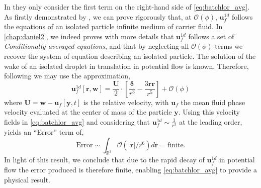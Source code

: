 In \citet{van1998pseudo} they only consider the first term on the right-hand side of \ref{eq:batchlor_avg}. 
As firstly demonstrated by \citet{hinch1977averaged}, we can prove rigorously that, at $\mathcal{O}(\phi)$, $\textbf{u}_f^{1d}$ follows the equations of an isolated particle infinite medium of carrier fluid. 
In \ref{chap:daniel2}, we indeed proves with more details that $\textbf{u}_f^{1d}$ follows a set of \textit{Conditionally averaged equations}, and that by neglecting all $\mathcal{O}(\phi)$ terms we recover the system of equation describing an isolated particle. 
The solution of the wake of an isolated droplet in translation in potential flow is known. 
Therefore, following \citet{van1998pseudo,zhang1994averaged} we may use the approximation, 
\begin{equation}
    \textbf{u}_f^{1d}[\textbf{r},\textbf{w}]
    = 
    \frac{\textbf{U}}{2}\cdot \left[
        \frac{\bm\delta}{r^3}-\frac{3\textbf{rr}}{r^5}
    \right]
    + \mathcal{O}(\phi)
    \label{eq:potential_sol}
\end{equation}
where $\textbf{U} = \textbf{w} - \textbf{u}_f[\textbf{y},t]$ is the relative velocity, with $\textbf{u}_f$ the mean fluid phase velocity evaluated at the center of mass of the particle $\textbf{y}$. 
Using this velocity fields in \ref{eq:batchlor_avg} and considering that $\textbf{u}_f^{1d}\sim \frac{1}{r^3}$ at the leading order, yields an ``Error'' term of,  
\begin{equation*}
    \text{Error}
    \sim
    \int_{\mathbb{R}^3}
    \mathcal{O}(|\textbf{r}|/r^6)
    d\textbf{r}
    = \text{finite}. 
\end{equation*}
In light of this result, we conclude that due to the rapid decay of $\textbf{u}_f^{1d}$ in potential flow the error produced is therefore finite, enabling \ref{eq:batchlor_avg} to provide a physical result.

